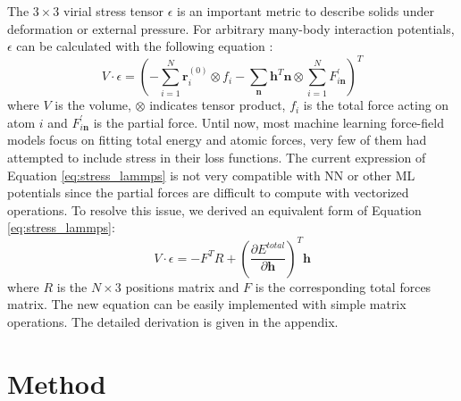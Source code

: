 \documentclass[preprint]{revtex4-2}
\begin{document}
The $3 \times 3$ virial stress tensor $\epsilon$ is an important metric to 
describe solids under deformation or external pressure. For arbitrary many-body 
interaction potentials, $\epsilon$ can be calculated with the following equation
\cite{lammps_stress}:
\begin{equation}
\label{eq:stress_lammps}
V \cdot \epsilon = \left(-\sum_{i=1}^{N}{\mathbf{r}_i^{(0)} \otimes f_i} - 
\sum_{\mathbf{n}}{\mathbf{h}^T\mathbf{n}} \otimes 
\sum_{i=1}^{N}{F^{\prime}_{i\mathbf{n}}}
\right)^T
\end{equation}
where $V$ is the volume, $\otimes$ indicates tensor product, $f_i$ is the total 
force acting on atom $i$ and $F^{\prime}_{i\mathbf{n}}$ is the partial force. 
Until now, most machine learning force-field models focus on fitting total 
energy and atomic forces, very few of them\cite{DeePMD,DeePMD_rl,DeePMD_kit} had 
attempted to include stress in their loss functions. 
The current expression of Equation \ref{eq:stress_lammps} is not very compatible 
with NN or other ML potentials since the partial forces are difficult to compute 
with vectorized operations. To resolve this issue, we derived an equivalent form 
of Equation \ref{eq:stress_lammps}:
\begin{equation}
\label{eq:stress}
V \cdot \epsilon = -F^{T} R + 
\left(\frac{\partial E^{total}}{\partial \mathbf{h}}\right)^T \mathbf{h}
\end{equation}
where $R$ is the $N \times 3$ positions matrix and $F$ is the 
corresponding total forces matrix. The new equation can be easily implemented 
with simple matrix operations. The detailed derivation is given in the appendix.

% 
%
\section{Method}
\label{section:method}

\newcommand{\nmax}{
    N_{\mathrm{Ni}}^{\mathrm{max}}+N_{\mathrm{Mo}}^{\mathrm{max}}
}
\newcommand{\nijmax}{N_{ij}^{\mathrm{max}}}
\newcommand{\nijkmax}{N_{ijk}^{\mathrm{max}}}
\newcommand{\nelmax}{N^{\mathrm{max}}_{\mathrm{el}}}
\newcommand{\nel}{N_{\mathrm{element}}}
\newcommand{\nvap}{N^{\mathrm{vap}}}
\newcommand{\nnimax}{N^{\mathrm{max}}_{\mathrm{Ni}}}
\newcommand{\nmomax}{N^{\mathrm{max}}_{\mathrm{Mo}}}
\end{document}
